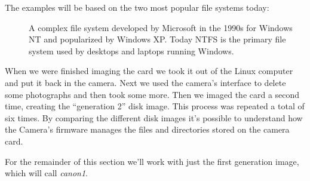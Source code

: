 The
examples will be based on the two most popular file systems today:
\begin{description}
\item[
\item[NTFS (New Technology File System)] A complex file system developed by Microsoft in
the 1990s for Windows NT and popularized by Windows XP. Today NTFS is
the primary file system used by desktops and laptops running Windows.
\end{description}




When we were finished imaging the card we took it out of the Linux
computer and put it back in the camera. Next we used the camera's
interface to delete some photographs and then took some more. Then we
imaged the card a second time, creating the ``generation 2'' disk
image. This process was repeated a total of six times. By comparing
the different disk images it's possible to understand how the Camera's
firmware manages the files and directories stored on the camera card.

For the remainder of this section we'll work with just the first
generation image, which will call \emph{canon1}. 



